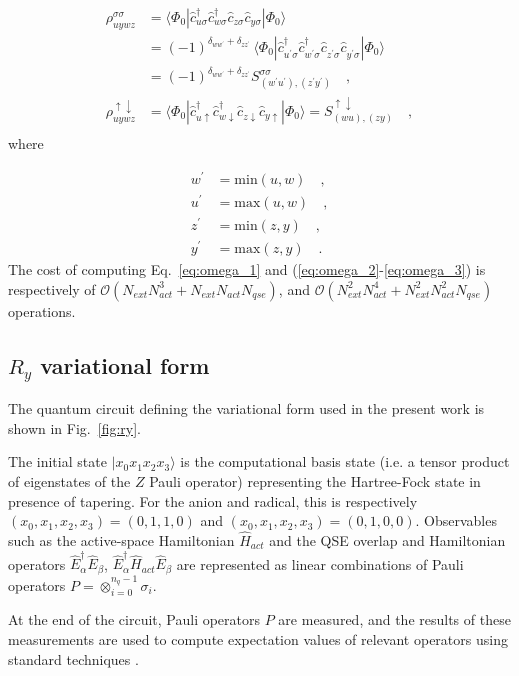 \documentclass[aps,pra,twocolumn]{revtex4-2}
\newcommand{\crt}[1]{\hat{c}_{#1}^\dagger}
\newcommand{\dst}[1]{\hat{c}_{#1}^{\phantom{\dagger}}}
\begin{document}
\pagebreak %

\begin{equation}
\begin{split}
\rho^{\sigma\sigma}_{uywz} 
&= \langle \Phi_0 | \crt{u\sigma} \crt{w\sigma} \dst{z\sigma} \dst{y\sigma} | \Phi_0 \rangle \\
&= (-1)^{\delta_{w w^\prime}+\delta_{z z^\prime}} \, \langle \Phi_0 | \crt{u^\prime\sigma} \crt{w^\prime\sigma} \dst{z^\prime\sigma} \dst{y^\prime\sigma} | \Phi_0 \rangle \\
&= (-1)^{\delta_{w w^\prime}+\delta_{z z^\prime}} S^{\sigma\sigma}_{(w^\prime u^\prime),(z^\prime y^\prime)} \quad, \\
\rho^{\uparrow\downarrow}_{uywz}  
&= \langle \Phi_0 | \crt{u\uparrow} \crt{w\downarrow} \dst{z\downarrow} \dst{y\uparrow} | \Phi_0 \rangle = S^{\uparrow\downarrow}_{(wu),(zy)} \quad, \\
\end{split}
\end{equation}
where

\begin{equation}
\begin{split}
w^\prime &= \mbox{min}(u,w) \quad, \\
u^\prime &= \mbox{max}(u,w) \quad, \\
z^\prime &= \mbox{min}(z,y) \quad, \\
y^\prime &= \mbox{max}(z,y) \quad. 
\end{split}
\end{equation}
The cost of computing Eq.~\eqref{eq:omega_1} and (\ref{eq:omega_2}-\ref{eq:omega_3}) is respectively of $\mathcal{O}(N_{ext} N_{act}^3 + N_{ext} N_{act} N_{qse})$,
and  $\mathcal{O}(N^2_{ext} N_{act}^4 + N^2_{ext} N^2_{act} N_{qse})$ operations.

\subsection{$R_y$ variational form}
\label{app:ry}

The quantum circuit defining the variational form used in the present work is shown in Fig.~\ref{fig:ry}.

The initial state $|x_0 x_1 x_2 x_3 \rangle$ is the computational basis state (i.e. a tensor product of eigenstates of the $Z$ Pauli operator)
representing the Hartree-Fock state in presence of tapering. For the anion and radical, this is respectively $(x_0,x_1,x_2,x_3)=(0,1,1,0)$
and $(x_0,x_1,x_2,x_3)=(0,1,0,0)$.
Observables such as the active-space Hamiltonian $\hat{H}_{act}$ and the QSE overlap and Hamiltonian operators $\hat{E}_\alpha^\dagger \hat{E}_\beta$,
$\hat{E}_\alpha^\dagger \hat{H}_{act} \hat{E}_\beta$ are represented as linear combinations of Pauli operators $P = \otimes_{i=0}^{n_q-1} \sigma_i$.

At the end of the circuit, Pauli operators $P$ are measured, and the results of these measurements are used to compute expectation values of relevant 
operators using standard techniques \cite{aleksandrowicz2019qiskit}.



\end{document}
